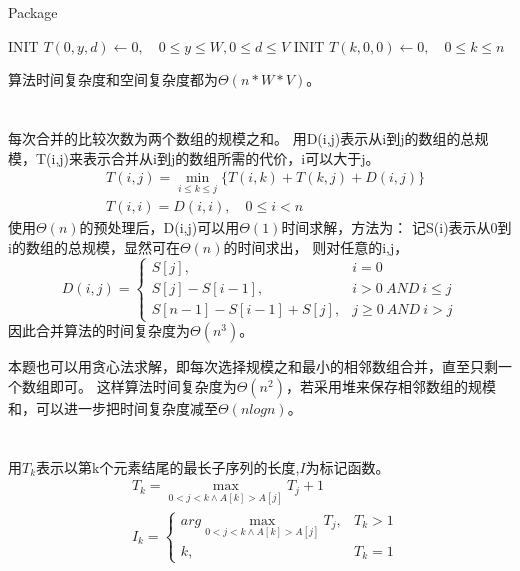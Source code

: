 \documentclass{article}
\begin{document}
\begin{CJK}{UTF8}{gbsn}
\begin{algorithm}
\caption{Package}
\begin{algorithmic}[1]
\STATE INIT $T(0,y,d) \gets 0,\quad0 \le y\le W,0\le d\le V$
\STATE INIT $T(k,0,0) \gets 0,\quad0 \le k\le n$
    \ELSE
    \ENDIF
\ENDFOR
\ENDFOR
\ENDFOR
\end{algorithmic}
\end{algorithm}

算法时间复杂度和空间复杂度都为$\Theta(n*W*V)$。

\section{}
每次合并的比较次数为两个数组的规模之和。
用D(i,j)表示从i到j的数组的总规模，T(i,j)来表示合并从i到j的数组所需的代价，i可以大于j。
\begin{align*}
& T(i,j)=\min_{i\le k\le j}{\{T(i,k)+T(k,j)+D(i,j)\}} \\
& T(i,i)=D(i,i), \quad0\le i <n
\end{align*}
使用$\Theta(n)$的预处理后，D(i,j)可以用$\Theta(1)$时间求解，方法为：
记S(i)表示从0到i的数组的总规模，显然可在$\Theta(n)$的时间求出，
则对任意的i,j，
\[  D(i,j)=\left\{
\begin{array}{ll}
S[j],   & i=0 \\
S[j]-S[i-1], & i>0\ AND\ i\le j \\
S[n-1]-S[i-1]+S[j], & j\ge0\ AND\ i>j
\end{array} \right.
\]
因此合并算法的时间复杂度为$\Theta(n^3)$。

本题也可以用贪心法求解，即每次选择规模之和最小的相邻数组合并，直至只剩一个数组即可。
这样算法时间复杂度为$\Theta(n^2)$，若采用堆来保存相邻数组的规模和，可以进一步把时间复杂度减至$\Theta(nlogn)$。

\section{}
用$T_k$表示以第k个元素结尾的最长子序列的长度,$I$为标记函数。
\begin{align*}
& T_k=\max_{0<j<k\land A[k]>A[j]}{T_j+1} \\
& I_k=\left\{
\begin{array}{ll}
arg\max_{0<j<k\land A[k]>A[j]}{T_j},   & T_k>1 \\
k,                                      & T_k=1 
\end{array} \right.
\end{align*}


\end{CJK}
\end{document}
